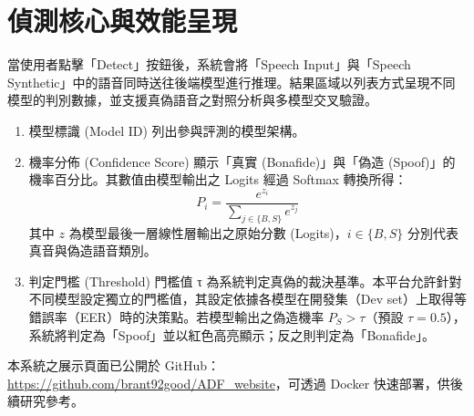 \section{偵測核心與效能呈現}
當使用者點擊「Detect」按鈕後，系統會將「Speech Input」與「Speech Synthetic」中的語音同時送往後端模型進行推理。結果區域以列表方式呈現不同模型的判別數據，並支援真偽語音之對照分析與多模型交叉驗證。
\begin{enumerate}
     \item{模型標識 (Model ID)}
        列出參與評測的模型架構。
        \item{機率分佈 (Confidence Score)}
        顯示「真實 (Bonafide)」與「偽造 (Spoof)」的機率百分比。其數值由模型輸出之 Logits 經過 Softmax 轉換所得：
        \begin{equation}
        P_{i} = \frac{e^{z_i}}{\sum_{j \in \{B, S\}} e^{z_j}}
        \end{equation}
        其中 $z$ 為模型最後一層線性層輸出之原始分數 (Logits)，$i \in \{B, S\}$ 分別代表真音與偽造語音類別。
        
        \item{判定門檻 (Threshold)}
        門檻值 τ 為系統判定真偽的裁決基準。本平台允許針對不同模型設定獨立的門檻值，其設定依據各模型在開發集（Dev set）上取得等錯誤率（EER）時的決策點。若模型輸出之偽造機率 $P_S > \tau$（預設 $\tau = 0.5$），系統將判定為「Spoof」並以紅色高亮顯示；反之則判定為「Bonafide」。

\end{enumerate}

本系統之展示頁面已公開於 GitHub：\url{https://github.com/brant92good/ADF_website}，可透過 Docker 快速部署，供後續研究參考。
